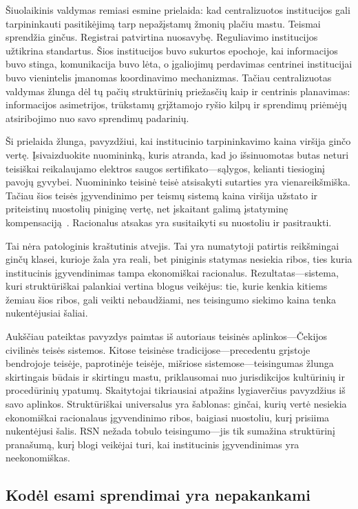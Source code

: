 \documentclass[11pt,a4paper,twocolumn]{article}
\begin{document}
Šiuolaikinis valdymas remiasi esmine prielaida: kad centralizuotos institucijos gali tarpininkauti pasitikėjimą tarp nepažįstamų žmonių plačiu mastu. Teismai sprendžia ginčus. Registrai patvirtina nuosavybę. Reguliavimo institucijos užtikrina standartus. Šios institucijos buvo sukurtos epochoje, kai informacijos buvo stinga, komunikacija buvo lėta, o įgaliojimų perdavimas centrinei institucijai buvo vienintelis įmanomas koordinavimo mechanizmas. Tačiau centralizuotas valdymas žlunga dėl tų pačių struktūrinių priežasčių kaip ir centrinis planavimas: informacijos asimetrijos, trūkstamų grįžtamojo ryšio kilpų ir sprendimų priėmėjų atsiribojimo nuo savo sprendimų padarinių.

Ši prielaida žlunga, pavyzdžiui, kai institucinio tarpininkavimo kaina viršija ginčo vertę. Įsivaizduokite nuomininką, kuris atranda, kad jo išsinuomotas butas neturi teisiškai reikalaujamo elektros saugos sertifikato---sąlygos, kelianti tiesioginį pavojų gyvybei. Nuomininko teisinė teisė atsisakyti sutarties yra vienareikšmiška. Tačiau šios teisės įgyvendinimo per teismų sistemą kaina viršija užstato ir priteistinų nuostolių piniginę vertę, net įskaitant galimą įstatyminę kompensaciją~\cite{czcourtfees}. Racionalus atsakas yra susitaikyti su nuostoliu ir pasitraukti.

Tai nėra patologinis kraštutinis atvejis. Tai yra numatytoji patirtis reikšmingai ginčų klasei, kurioje žala yra reali, bet piniginis statymas nesiekia ribos, ties kuria institucinis įgyvendinimas tampa ekonomiškai racionalus. Rezultatas---sistema, kuri struktūriškai palankiai vertina blogus veikėjus: tie, kurie kenkia kitiems žemiau šios ribos, gali veikti nebaudžiami, nes teisingumo siekimo kaina tenka nukentėjusiai šaliai.

Aukščiau pateiktas pavyzdys paimtas iš autoriaus teisinės aplinkos---Čekijos civilinės teisės sistemos. Kitose teisinėse tradicijose---precedentu grįstoje bendrojoje teisėje, paprotinėje teisėje, mišriose sistemose---teisingumas žlunga skirtingais būdais ir skirtingu mastu, priklausomai nuo jurisdikcijos kultūrinių ir procedūrinių ypatumų. Skaitytojai tikriausiai atpažins lygiaverčius pavyzdžius iš savo aplinkos. Struktūriškai universalus yra šablonas: ginčai, kurių vertė nesiekia ekonomiškai racionalaus įgyvendinimo ribos, baigiasi nuostoliu, kurį prisiima nukentėjusi šalis. RSN nežada tobulo teisingumo---jis tik sumažina struktūrinį pranašumą, kurį blogi veikėjai turi, kai institucinis įgyvendinimas yra neekonomiškas.

\subsection{Kodėl esami sprendimai yra nepakankami}
\end{document}
